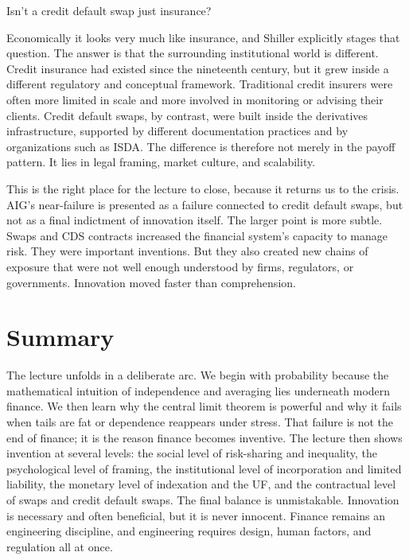 Isn't a credit default swap just insurance?

Economically it looks very much like insurance, and Shiller explicitly stages that question. The answer is that the surrounding institutional world is different. Credit insurance had existed since the nineteenth century, but it grew inside a different regulatory and conceptual framework. Traditional credit insurers were often more limited in scale and more involved in monitoring or advising their clients. Credit default swaps, by contrast, were built inside the derivatives infrastructure, supported by different documentation practices and by organizations such as ISDA. The difference is therefore not merely in the payoff pattern. It lies in legal framing, market culture, and scalability.

This is the right place for the lecture to close, because it returns us to the crisis. AIG's near-failure is presented as a failure connected to credit default swaps, but not as a final indictment of innovation itself. The larger point is more subtle. Swaps and CDS contracts increased the financial system's capacity to manage risk. They were important inventions. But they also created new chains of exposure that were not well enough understood by firms, regulators, or governments. Innovation moved faster than comprehension.

\section{Summary}

The lecture unfolds in a deliberate arc. We begin with probability because the mathematical intuition of independence and averaging lies underneath modern finance. We then learn why the central limit theorem is powerful and why it fails when tails are fat or dependence reappears under stress. That failure is not the end of finance; it is the reason finance becomes inventive. The lecture then shows invention at several levels: the social level of risk-sharing and inequality, the psychological level of framing, the institutional level of incorporation and limited liability, the monetary level of indexation and the UF, and the contractual level of swaps and credit default swaps. The final balance is unmistakable. Innovation is necessary and often beneficial, but it is never innocent. Finance remains an engineering discipline, and engineering requires design, human factors, and regulation all at once.
